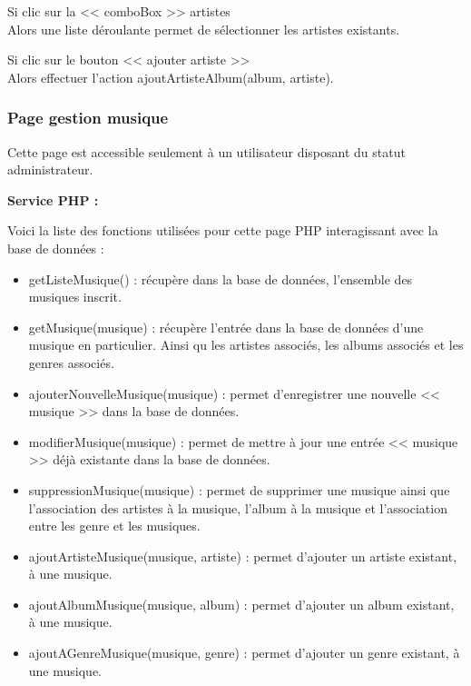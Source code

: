 			\begin{paragraphe}
				Si clic sur la << comboBox >> artistes \\
				Alors une liste déroulante permet de sélectionner les artistes existants.
			\end{paragraphe}

			\begin{paragraphe}
				Si clic sur le bouton << ajouter artiste >> \\
				Alors effectuer l'action ajoutArtisteAlbum(album, artiste).
			\end{paragraphe}

		\subsubsection{Page gestion musique}

			\begin{paragraphe}
				Cette page est accessible seulement à un utilisateur disposant du statut administrateur.
			\end{paragraphe}

			\begin{paragraphe}
				\textbf{Service PHP :}
			\end{paragraphe}

			\begin{paragraphe}
				Voici la liste des fonctions utilisées pour cette page PHP interagissant avec la base de données :
			\end{paragraphe}

			\begin{paragraphe}
				\begin{itemize}
					\item getListeMusique() : récupère dans la base de données, l'ensemble des musiques inscrit.
					\item getMusique(musique) : récupère l'entrée dans la base de données d'une musique en particulier. Ainsi qu les artistes associés, les albums associés et les genres associés.
					\item ajouterNouvelleMusique(musique) : permet d'enregistrer une nouvelle << musique >> dans la base de données.
					\item modifierMusique(musique) : permet de mettre à jour une entrée << musique >> déjà existante dans la base de données.
					\item suppressionMusique(musique) : permet de supprimer une musique ainsi que l'association des artistes à la musique, l'album à la musique et l'association entre les genre et les musiques.
					\item ajoutArtisteMusique(musique, artiste) : permet d'ajouter un artiste existant, à une musique.
					\item ajoutAlbumMusique(musique, album) : permet d'ajouter un album existant, à une musique.
					\item ajoutAGenreMusique(musique, genre) : permet d'ajouter un genre existant, à une musique.
				\end{itemize}
			\end{paragraphe}


